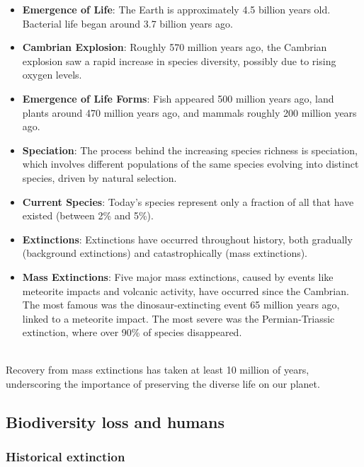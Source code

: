 \documentclass[../summary.tex]{subfiles}
\begin{document}
\begin{itemize}
	\item \textbf{Emergence of Life}: The Earth is approximately 4.5 billion years old. Bacterial life began around 3.7 billion years ago.
	\item \textbf{Cambrian Explosion}: Roughly 570 million years ago, the Cambrian explosion saw a rapid increase in species diversity, possibly due to rising oxygen levels.
	\item \textbf{Emergence of Life Forms}: Fish appeared 500 million years ago, land plants around 470 million years ago, and mammals roughly 200 million years ago.
	\item \textbf{Speciation}: The process behind the increasing species richness is speciation, which involves different populations of the same species evolving into distinct species, driven by natural selection.
	\item \textbf{Current Species}: Today's species represent only a fraction of all that have existed (between 2\% and 5\%).
	\item \textbf{Extinctions}: Extinctions have occurred throughout history, both gradually (background extinctions) and catastrophically (mass extinctions).
	\item \textbf{Mass Extinctions}: Five major mass extinctions, caused by events like meteorite impacts and volcanic activity, have occurred since the Cambrian. The most famous was the dinosaur-extincting event 65 million years ago, linked to a meteorite impact. The most severe was the Permian-Triassic extinction, where over 90\% of species disappeared.
\end{itemize}
\ \\
Recovery from mass extinctions has taken at least 10 million of years, underscoring the importance of preserving the diverse life on our planet.
\newpage

\subsection{Biodiversity loss and humans}
\subsubsection{Historical extinction}
\end{document}
